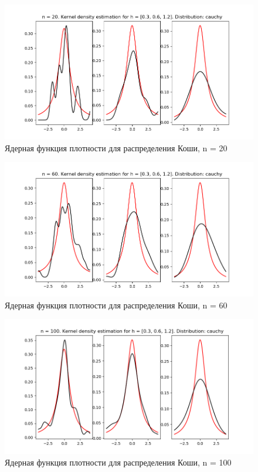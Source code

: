 \documentclass[a4]{article}
\begin{document}
\begin{center}
    \begin{figure}[H]
 \caption{Ядерная функция плотности для распределения Коши, n = 20}
\includegraphics[width=\textwidth]{d_cauchy20.png}
\end{figure}
    \begin{figure}[H]
 \caption{Ядерная функция плотности для распределения Коши, n = 60}
\includegraphics[width=\textwidth]{d_cauchy60.png}
\end{figure}
    \begin{figure}[H]
 \caption{Ядерная функция плотности для распределения Коши, n = 100}
\includegraphics[width=\textwidth]{d_cauchy100.png}
\end{figure}


\end{center}
\end{document}
